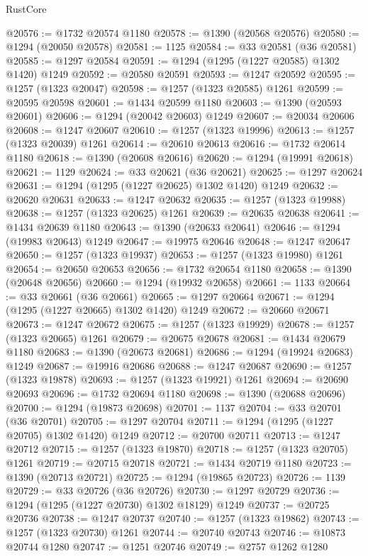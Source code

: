 \begin{lexlean}{RustCore}
\begin{coremodule}
@20576 := @1732 @20574 @1180
@20578 := @1390 (@20568 @20576)
@20580 := @1294 (@20050 @20578)
@20581 := 1125
@20584 := @33 @20581 (@36 @20581)
@20585 := @1297 @20584
@20591 := @1294 (@1295 (@1227 @20585) @1302 @1420) @1249
@20592 := @20580 @20591
@20593 := @1247 @20592
@20595 := @1257 (@1323 @20047)
@20598 := @1257 (@1323 @20585) @1261
@20599 := @20595 @20598
@20601 := @1434 @20599 @1180
@20603 := @1390 (@20593 @20601)
@20606 := @1294 (@20042 @20603) @1249
@20607 := @20034 @20606
@20608 := @1247 @20607
@20610 := @1257 (@1323 @19996)
@20613 := @1257 (@1323 @20039) @1261
@20614 := @20610 @20613
@20616 := @1732 @20614 @1180
@20618 := @1390 (@20608 @20616)
@20620 := @1294 (@19991 @20618)
@20621 := 1129
@20624 := @33 @20621 (@36 @20621)
@20625 := @1297 @20624
@20631 := @1294 (@1295 (@1227 @20625) @1302 @1420) @1249
@20632 := @20620 @20631
@20633 := @1247 @20632
@20635 := @1257 (@1323 @19988)
@20638 := @1257 (@1323 @20625) @1261
@20639 := @20635 @20638
@20641 := @1434 @20639 @1180
@20643 := @1390 (@20633 @20641)
@20646 := @1294 (@19983 @20643) @1249
@20647 := @19975 @20646
@20648 := @1247 @20647
@20650 := @1257 (@1323 @19937)
@20653 := @1257 (@1323 @19980) @1261
@20654 := @20650 @20653
@20656 := @1732 @20654 @1180
@20658 := @1390 (@20648 @20656)
@20660 := @1294 (@19932 @20658)
@20661 := 1133
@20664 := @33 @20661 (@36 @20661)
@20665 := @1297 @20664
@20671 := @1294 (@1295 (@1227 @20665) @1302 @1420) @1249
@20672 := @20660 @20671
@20673 := @1247 @20672
@20675 := @1257 (@1323 @19929)
@20678 := @1257 (@1323 @20665) @1261
@20679 := @20675 @20678
@20681 := @1434 @20679 @1180
@20683 := @1390 (@20673 @20681)
@20686 := @1294 (@19924 @20683) @1249
@20687 := @19916 @20686
@20688 := @1247 @20687
@20690 := @1257 (@1323 @19878)
@20693 := @1257 (@1323 @19921) @1261
@20694 := @20690 @20693
@20696 := @1732 @20694 @1180
@20698 := @1390 (@20688 @20696)
@20700 := @1294 (@19873 @20698)
@20701 := 1137
@20704 := @33 @20701 (@36 @20701)
@20705 := @1297 @20704
@20711 := @1294 (@1295 (@1227 @20705) @1302 @1420) @1249
@20712 := @20700 @20711
@20713 := @1247 @20712
@20715 := @1257 (@1323 @19870)
@20718 := @1257 (@1323 @20705) @1261
@20719 := @20715 @20718
@20721 := @1434 @20719 @1180
@20723 := @1390 (@20713 @20721)
@20725 := @1294 (@19865 @20723)
@20726 := 1139
@20729 := @33 @20726 (@36 @20726)
@20730 := @1297 @20729
@20736 := @1294 (@1295 (@1227 @20730) @1302 @18129) @1249
@20737 := @20725 @20736
@20738 := @1247 @20737
@20740 := @1257 (@1323 @19862)
@20743 := @1257 (@1323 @20730) @1261
@20744 := @20740 @20743
@20746 := @10873 @20744 @1280
@20747 := @1251 @20746
@20749 := @2757 @1262 @1280

\end{coremodule}
\end{lexlean}
